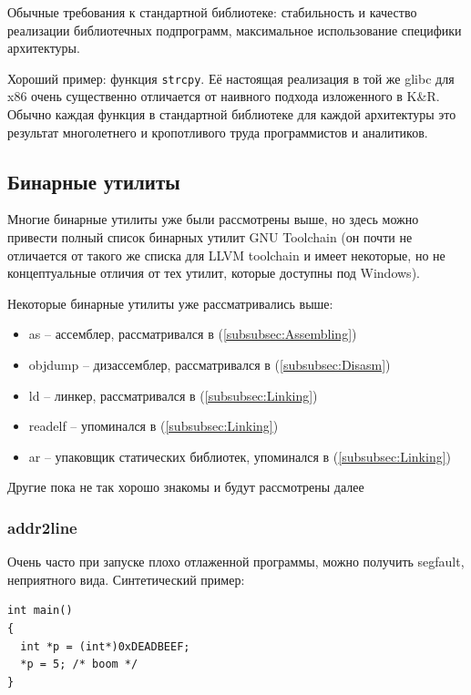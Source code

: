 \documentclass[a4paper,12pt,oneside]{article}
\begin{document}
Обычные требования к стандартной библиотеке: стабильность и качество реализации библиотечных подпрограмм, максимальное использование специфики архитектуры.

Хороший пример: функция \lstinline!strcpy!. Её настоящая реализация в той же glibc для x86 очень существенно отличается от наивного подхода изложенного в K\&R. Обычно каждая функция в стандартной библиотеке для каждой архитектуры это результат многолетнего и кропотливого труда программистов и аналитиков.

\subsection{Бинарные утилиты}\label{subsec:Binutils}

Многие бинарные утилиты уже были рассмотрены выше, но здесь можно привести полный список бинарных утилит GNU Toolchain (он почти не отличается от такого же списка для LLVM toolchain и имеет некоторые, но не концептуальные отличия от тех утилит, которые доступны под Windows).

Некоторые бинарные утилиты уже рассматривались выше:

\begin{itemize}
\item as -- ассемблер, рассматривался в (\ref{subsubsec:Assembling})
\item objdump -- дизассемблер, рассматривался в (\ref{subsubsec:Disasm})
\item ld -- линкер, рассматривался в (\ref{subsubsec:Linking})
\item readelf -- упоминался в (\ref{subsubsec:Linking})
\item ar -- упаковщик статических библиотек, упоминался в (\ref{subsubsec:Linking})
\end{itemize}

Другие пока не так хорошо знакомы и будут рассмотрены далее 

\subsubsection{addr2line}\label{subsubsec:AddrLine}

Очень часто при запуске плохо отлаженной программы, можно получить segfault, неприятного вида. Синтетический пример:

\begin{lstlisting}
int main()
{
  int *p = (int*)0xDEADBEEF;
  *p = 5; /* boom */
}
\end{lstlisting}
\end{document}

